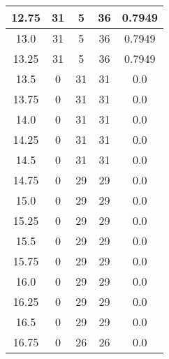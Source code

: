 \documentclass[letterpaper, 12pt]{article}
\begin{document}
\begin{longtable}{|c|c|c|c|c|}
\hline
12.75 & 31 & 5 & 36 & 0.7949 \\
\hline
13.0 & 31 & 5 & 36 & 0.7949 \\
\hline
13.25 & 31 & 5 & 36 & 0.7949 \\
\hline
13.5 & 0 & 31 & 31 & 0.0 \\
\hline
13.75 & 0 & 31 & 31 & 0.0 \\
\hline
14.0 & 0 & 31 & 31 & 0.0 \\
\hline
14.25 & 0 & 31 & 31 & 0.0 \\
\hline
14.5 & 0 & 31 & 31 & 0.0 \\
\hline
14.75 & 0 & 29 & 29 & 0.0 \\
\hline
15.0 & 0 & 29 & 29 & 0.0 \\
\hline
15.25 & 0 & 29 & 29 & 0.0 \\
\hline
15.5 & 0 & 29 & 29 & 0.0 \\
\hline
15.75 & 0 & 29 & 29 & 0.0 \\
\hline
16.0 & 0 & 29 & 29 & 0.0 \\
\hline
16.25 & 0 & 29 & 29 & 0.0 \\
\hline
16.5 & 0 & 29 & 29 & 0.0 \\
\hline
16.75 & 0 & 26 & 26 & 0.0 \\
\hline
\end{longtable}
\end{document}
